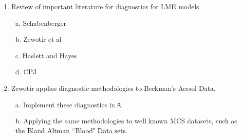 \documentclass[a4paper,12pt]{article}
\begin{document}
\begin{itemize}
\item[1.] Review of important literature for diagnostics for LME models


\begin{itemize}
\item[a.] Schabenberger

\item[b.] Zewotir et al

\item[c.] Haslett and Hayes

\item[d.] CPJ
\end{itemize}


\item[2.] Zewotir applies diagnostic methodologies to Beckman's Aersol Data.

\begin{itemize}
\item[a.] Implement these diagnostics in \texttt{R}.
\item[b.] Applying the same methodologies to well known MCS datasets, such as the Bland Altman ``Blood" Data sets.
\end{itemize}
\end{itemize}
\end{document}
